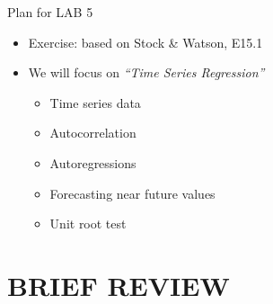 \documentclass[
  10pt,
  ignorenonframetext,
]{beamer}
\providecommand{\tightlist}{%
  \setlength{\itemsep}{0pt}\setlength{\parskip}{0pt}}
\begin{document}
\begin{frame}{Plan for LAB 5}
\protect\hypertarget{plan-for-lab-5}{}
\begin{itemize}
\tightlist
\item
  Exercise: based on Stock \& Watson, E15.1
\end{itemize}

\vspace{0.8mm}

\begin{itemize}
\tightlist
\item
  We will focus on \emph{``Time Series Regression''}

  \begin{itemize}
  \tightlist
  \item
    Time series data
  \item
    Autocorrelation
  \item
    Autoregressions
  \item
    Forecasting near future values
  \item
    Unit root test
  \end{itemize}
\end{itemize}
\end{frame}

\hypertarget{brief-review}{%
\section{BRIEF REVIEW}\label{brief-review}}
\end{document}

